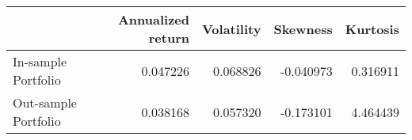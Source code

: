 \begin{tabular}{lrrrr}
\toprule
{} &  Annualized return &  Volatility &  Skewness &  Kurtosis \\
\midrule
In-sample Portfolio  &           0.047226 &    0.068826 & -0.040973 &  0.316911 \\
Out-sample Portfolio &           0.038168 &    0.057320 & -0.173101 &  4.464439 \\
\bottomrule
\end{tabular}
